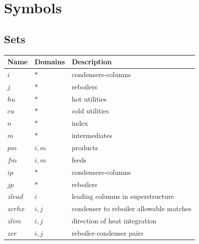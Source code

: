 \documentclass[11pt]{article}
\begin{document}
\section*{Symbols}


\subsection*{Sets}
\begin{tabularx}{\textwidth}{| l | l | X |}
\hline
\textbf{Name} & \textbf{Domains} & \textbf{Description}\\
\hline
\endhead

$i$ & $*$ & condensers-columns\\
$j$ & $*$ & reboilers\\
$hu$ & $*$ & hot utilities\\
$cu$ & $*$ & cold utilities\\
$n$ & $*$ & index\\
$m$ & $*$ & intermediates\\
$pm$ & $i,m$ & products\\
$fm$ & $i,m$ & feeds\\
$ip$ & $*$ & condensers-columns\\
$jp$ & $*$ & reboilers\\
$zlead$ & $i$ & leading columns in superstructure\\
$zcrhx$ & $i,j$ & condenser to reboiler allowable matches\\
$zlim$ & $i,j$ & direction of heat integration\\
$zcr$ & $i,j$ & reboiler-condenser pairs\\
\hline
\end{tabularx}
\end{document}
